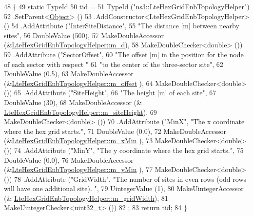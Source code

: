 \begin{DoxyCode}
48 \{
49   \textcolor{keyword}{static} TypeId
50     tid =
51     TypeId (\textcolor{stringliteral}{"ns3::LteHexGridEnbTopologyHelper"})
52     .SetParent<\hyperlink{classns3_1_1Object_a40860402e64d8008fb42329df7097cdb}{Object}> ()
53     .AddConstructor<LteHexGridEnbTopologyHelper> ()
54     .AddAttribute (\textcolor{stringliteral}{"InterSiteDistance"},
55                    \textcolor{stringliteral}{"The distance [m] between nearby sites"},
56                    DoubleValue (500),
57                    MakeDoubleAccessor (&\hyperlink{classns3_1_1LteHexGridEnbTopologyHelper_a4cb78cf5b28239336ec6d88fe1743c7f}{LteHexGridEnbTopologyHelper::m\_d}),
58                    MakeDoubleChecker<double> ())
59     .AddAttribute (\textcolor{stringliteral}{"SectorOffset"},
60                    \textcolor{stringliteral}{"The offset [m] in the position for the node of each sector with respect "}
61                    \textcolor{stringliteral}{"to the center of the three-sector site"},
62                    DoubleValue (0.5),
63                    MakeDoubleAccessor (&\hyperlink{classns3_1_1LteHexGridEnbTopologyHelper_ad2c5634d5b3743e525cedec64ccaa9fe}{LteHexGridEnbTopologyHelper::m\_offset}
      ),
64                    MakeDoubleChecker<double> ())
65     .AddAttribute (\textcolor{stringliteral}{"SiteHeight"},
66                    \textcolor{stringliteral}{"The height [m] of each site"},
67                    DoubleValue (30),
68                    MakeDoubleAccessor (&
      \hyperlink{classns3_1_1LteHexGridEnbTopologyHelper_af38a5c65a2918c9019697aba8fef42d5}{LteHexGridEnbTopologyHelper::m\_siteHeight}),
69                    MakeDoubleChecker<double> ())
70     .AddAttribute (\textcolor{stringliteral}{"MinX"}, \textcolor{stringliteral}{"The x coordinate where the hex grid starts."},
71                    DoubleValue (0.0),
72                    MakeDoubleAccessor (&\hyperlink{classns3_1_1LteHexGridEnbTopologyHelper_a5486ea38b22f6e0c9c9fb7125aea6321}{LteHexGridEnbTopologyHelper::m\_xMin}
      ),
73                    MakeDoubleChecker<double> ())
74     .AddAttribute (\textcolor{stringliteral}{"MinY"}, \textcolor{stringliteral}{"The y coordinate where the hex grid starts."},
75                    DoubleValue (0.0),
76                    MakeDoubleAccessor (&\hyperlink{classns3_1_1LteHexGridEnbTopologyHelper_a87668f1e7197c17dee55fd90c9c94f7d}{LteHexGridEnbTopologyHelper::m\_yMin}
      ),
77                    MakeDoubleChecker<double> ())
78     .AddAttribute (\textcolor{stringliteral}{"GridWidth"}, \textcolor{stringliteral}{"The number of sites in even rows (odd rows will have one additional site).
      "},
79                    UintegerValue (1),
80                    MakeUintegerAccessor (&
      \hyperlink{classns3_1_1LteHexGridEnbTopologyHelper_a9a1f31192fb0859dd0a3dec3f776da25}{LteHexGridEnbTopologyHelper::m\_gridWidth}),
81                    MakeUintegerChecker<uint32\_t> ())
82   ;
83   \textcolor{keywordflow}{return} tid;
84 \}
\end{DoxyCode}


